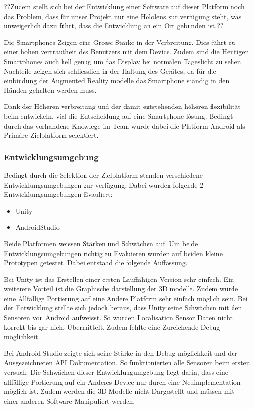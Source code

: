 \documentclass[a4paper]{scrreprt}
\begin{document}
??Zudem stellt sich bei der Entwicklung einer Software auf dieser Platform noch das Problem, dass für unser Projekt nur eine Hololens zur verfügung steht, was unweigerlich dazu führt, dass die Entwicklung an ein Ort gebunden ist.??
 
 
 
Die Smartphones Zeigen eine Grosse Stärke in der Verbreitung. Dies führt zu einer hohen vertrautheit des Benutzers mit dem Device. Zudem sind die Heutigen Smartphones auch hell genug um das Display bei normalen Tageslicht zu sehen.
Nachteile zeigen sich schliesslich in der Haltung des Gerätes, da für die einbindung der Augmented Reality modelle das Smartphone ständig in den Händen gehalten werden muss. 

Dank der Höheren verbreitung und der damit entstehenden höheren flexibilität beim entwickeln, viel die Entscheidung auf eine Smartphone lösung. Bedingt durch das vorhandene Knowlege im Team wurde dabei die Platform Android als Primäre Zielplatform selektiert.
\subsubsection{Entwicklungsumgebung}
Bedingt durch die Selektion der Zielplatform standen verschiedene Entwicklungsumgebungen zur verfügung. Dabei wurden folgende 2 Entwicklungsumgebungen Evauliert:
\begin{itemize}
\item Unity
\item AndroidStudio
\end{itemize}

Beide Platformen weissen Stärken und Schwächen auf. Um beide Entwicklungsumgebungen richtig zu Evaluieren wurden auf beiden kleine Prototypen getestet. Dabei entstand die folgende Auffassung.

Bei Unity ist das Erstellen einer ersten Lauffähigen Version sehr einfach. Ein weiterere Vorteil ist die Graphische darstellung der 3D modelle. Zudem würde eine Allfällige Portierung auf eine Andere Platform sehr einfach möglich sein. Bei der Entwicklung stellte sich jedoch heraus, dass Unity seine Schwächen mit den Sensoren von Android aufweisst. So wurden Localisation Sensor Daten nicht korrekt bis gar nicht Übermittelt. Zudem fehlte eine Zureichende Debug möglichkeit.

Bei Android Studio zeigte sich seine Stärke in den Debug möglichkeit und der Ausgezeichneten API Dokumentation. So funktionierten alle Sensoren beim ersten versuch. Die Schwächen dieser Entwicklungumgebung liegt darin, dass eine allfällige Portierung auf ein Anderes Device nur durch eine Neuimplementation möglich ist. Zudem werden die 3D Modelle nicht Dargestellt und müssen mit einer anderen Software Manipuliert werden.
\end{document}
